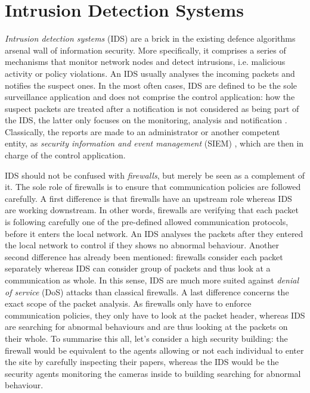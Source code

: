 \section{Intrusion Detection Systems}
\emph{Intrusion detection systems} (IDS) are a brick in the existing defence algorithms arsenal wall of information security. More specifically, it comprises a series of mechanisms that monitor network nodes and detect intrusions, i.e. malicious activity or policy violations. An IDS usually analyses the incoming packets and notifies the suspect ones. In the most often cases, IDS are defined to be the sole surveillance application and does not comprise the control application: how the suspect packets are treated after a notification is not considered as being part of the IDS, the latter only focuses on the monitoring, analysis and notification \cite{Mukherjee1994NetworkDetection}. Classically, the reports are made to an administrator or another competent entity, as \emph{security information and event management} (SIEM) \cite{Bhatt2014TheSystems}, which are then in charge of the control application. 

IDS should not be confused with \emph{firewalls}, but merely be seen as a complement of it. The sole role of firewalls is to ensure that communication policies are followed carefully. A first
difference is that firewalls have an upstream role whereas IDS are working downstream. In other words, firewalls are verifying that each packet is following carefully one of the pre-defined allowed communication protocols, before it enters the local network. An IDS analyses the packets after they entered the local network to control if they shows no abnormal behaviour. Another second difference has already been mentioned: firewalls consider each packet separately whereas IDS can consider group of packets and thus look at a communication as whole. In this sense, IDS are much more suited against \emph{denial of service} (DoS) attacks than classical firewalls. A last difference concerns the exact scope of the packet analysis. As firewalls only have to enforce communication policies, they only have to look at the packet header, whereas IDS are searching for abnormal behaviours and are thus looking at the packets on their whole. To summarise this all, let's consider a high security building: the firewall would be equivalent to the agents allowing or not each individual to enter the site by carefully inspecting their papers, whereas the IDS would be the security agents monitoring the cameras inside to building searching for abnormal behaviour.

